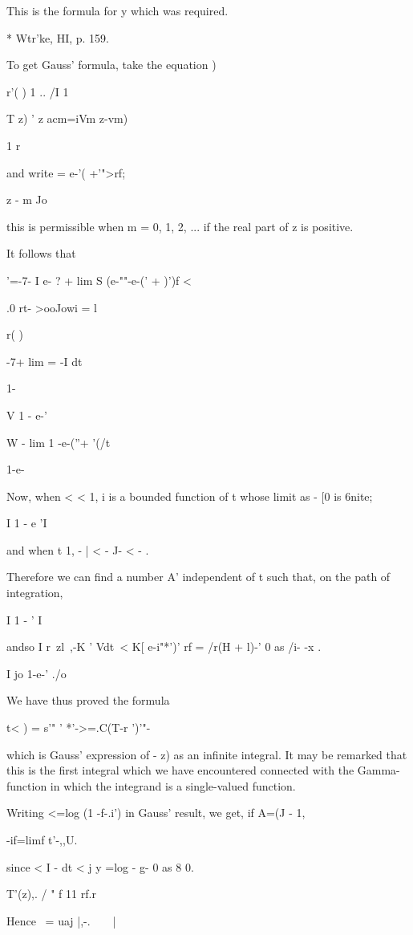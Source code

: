 This is the formula for y which was required.

* Wtr'ke, HI, p. 159.

%
%

To get Gauss' formula, take the equation )

r'( ) 1 .. /I 1 \

T z) ' z acm=iVm z-vm)

1 r

and write = e-'( +'">rf;

z - m Jo

this is permissible when m = 0, 1, 2, ... if the real part of z is
positive.

It follows that

 '=-7- I e- ? + lim S (e-""-e-(' + )')f <

.0 rt- >ooJowi = l

r( )

-7+ lim = -I dt

1-

V 1 - e-'

W - lim 1 -e-(''+ '(/t

1-e-

Now, when < < 1, i is a bounded function of t whose limit as - [0 is
6nite;

I 1 - e 'I

and when t 1, - | < - J- < - .

Therefore we can find a number A' independent of t such that, on the
path of integration,

I 1 - ' I

andso I r\ zl~,-K ' Vdt\ < K[ e-i"*')' rf = /r(H + l)-' 0 as /i- -x .

I jo 1-e-' ./o

We have thus proved the formula

t< ) = s'" ' *'->=.C(T-r ')'"-

which is Gauss' expression of - z) as an infinite integral. It may be
remarked that this is the first integral which we have encountered
connected with the Gamma-function in which the integrand is a
single-valued function.

Writing <=log (1 -f-.i') in Gauss' result, we get, if A=(J - 1,

 -if=limf t'-,,U.

since < I - dt < j y =log - g- 0 as 8 0.

T'(z),. / " f 11 rf.r

Hence \ = uaj |,-.\ \ \ \ |\,

